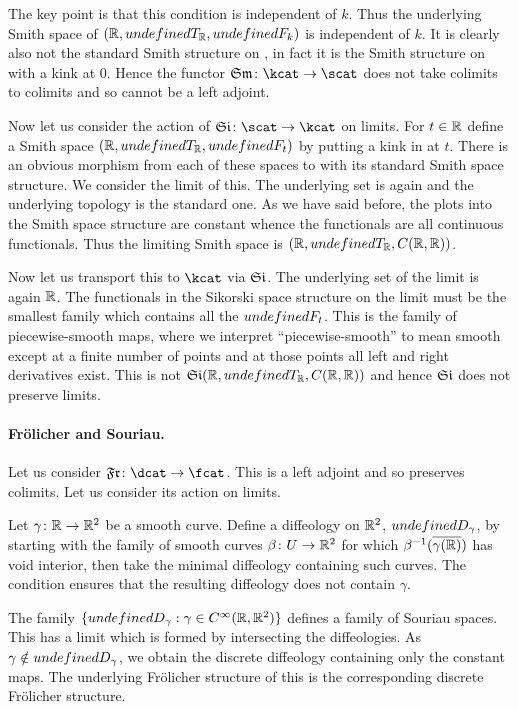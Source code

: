 \documentclass[%
a4paper,%
arxiv,%
defaults
]{myclass}
\begin{document}
The key point is that this condition is independent of \(k\).
Thus the underlying Smith space of
 \((\R, \m{T}_{\R}, \m{F}_k)\)
is independent of \(k\).
It is clearly also not the standard Smith structure on \R, in fact it is the Smith structure on \R with a kink at \(0\).
Hence the functor
 \(\SiSm \colon \kcat \to \scat\)
does not take colimits to colimits and so cannot be a left adjoint.

\medskip

Now let us consider the action of
 \(\SmSi \colon \scat \to \kcat\)
on limits.
For \(t \in \mathbb{R}\) define a Smith space
 \((\R, \m{T}_\R, \m{F}_t)\)
by putting a kink in \R at \(t\).
There is an obvious morphism from each of these spaces to \R with its standard Smith space structure.
We consider the limit of this.
The underlying set is again \R and the underlying topology is the standard one.
As we have said before,  the plots into the Smith space structure are constant whence the functionals are all continuous functionals.
Thus the limiting Smith space is \((\R, \m{T}_\R, C(\R,\R))\).

Now let us transport this to \(\kcat\) via \(\SmSi\).
The underlying set of the limit is again \(\mathbb{R}\).
The functionals in the Sikorski space structure on the limit must be the smallest family which contains all the \(\m{F}_t\).
This is the family of piecewise\hyp{}smooth maps, where we interpret ``piecewise\hyp{}smooth'' to mean smooth except at a finite number of points and at those points all left and right derivatives exist.
This is not
 \(\SmSi(\R, \m{T}_\R, C(\R,\R))\)
and hence \(\SmSi\) does not preserve limits.

\paragraph{Fr\"olicher and Souriau.}
Let us consider
 \(\SoFr \colon \dcat \to \fcat\).
This is a left adjoint and so preserves colimits.
Let us consider its action on limits.

Let
 \(\gamma \colon \mathbb{R} \to \mathbb{R}^2\)
be a smooth curve.
Define a diffeology on \(\mathbb{R}^2\), \(\m{D}_{\gamma}\), by starting with the family of smooth curves
 \(\beta \colon U \to \mathbb{R}^2\)
for which
 \(\beta^{-1}(\overline{\gamma(\mathbb{R})})\)
has void interior, then take the minimal diffeology containing such curves.
The condition ensures that the resulting diffeology does not contain \(\gamma\).

The family
 \(\{\m{D}_{\gamma} : \gamma \in \Ci(\R, \R^2)\}\)
defines a family of Souriau spaces.
This has a limit which is formed by intersecting the diffeologies.
As
 \(\gamma \notin \m{D}_{\gamma}\),
we obtain the discrete diffeology containing only the constant maps.
The underlying Fr\"olicher structure of this is the corresponding discrete Fr\"olicher structure.
\end{document}
